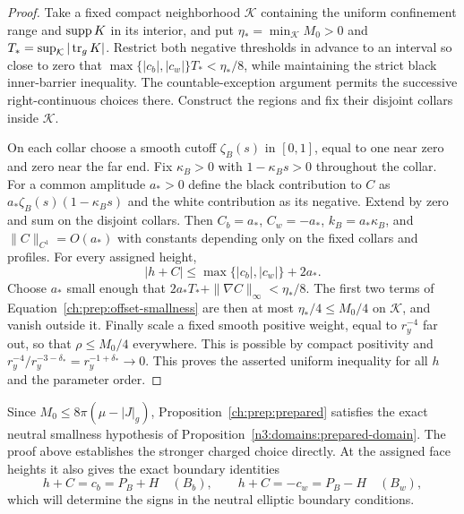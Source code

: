 \begin{proof}
Take a fixed compact neighborhood $\mathcal K$ containing the
uniform confinement range and $\operatorname{supp} K$ in its interior, and put
$\eta_*=\min_{\mathcal K}M_0>0$ and
$T_*=\sup_{\mathcal K}|\operatorname{tr}_gK|$.  Restrict both negative thresholds
in advance to an interval so close to zero that
$\max\{|c_b|,|c_w|\}T_*<\eta_*/8$, while maintaining the strict
black inner-barrier inequality.  The countable-exception argument
permits the successive right-continuous choices there.  Construct
the regions and fix their disjoint collars inside $\mathcal K$.

On each collar choose a smooth cutoff $\zeta_B(s)$ in $[0,1]$,
equal to one near zero and zero near the far end.  Fix
$\kappa_B>0$ with $1-\kappa_Bs>0$ throughout the collar.
For a common amplitude $a_*>0$ define the black contribution to
$C$ as $a_*\zeta_B(s)(1-\kappa_Bs)$ and the white contribution
as its negative.  Extend by zero and sum on the disjoint collars.
Then $C_b=a_*$, $C_w=-a_*$, $k_B=a_*\kappa_B$, and
$\|C\|_{C^1}=O(a_*)$ with constants depending only on the fixed
collars and profiles.  For every assigned height,
\[
 |h+C|\leq\max\{|c_b|,|c_w|\}+2a_*.
\]
Choose $a_*$ small enough that
$2a_*T_*+\|\nabla C\|_\infty<\eta_*/8$.
The first two terms of Equation~\eqref{ch:prep:offset-smallness} are
then at most $\eta_*/4\leq M_0/4$ on $\mathcal K$, and vanish
outside it.  Finally scale a fixed smooth positive weight, equal to
$r_y^{-4}$ far out, so that $\rho\leq M_0/4$ everywhere.
This is possible by compact positivity and
$r_y^{-4}/r_y^{-3-\delta_*}=r_y^{-1+\delta_*}\to0$.
This proves the asserted uniform inequality for all $h$ and the
parameter order.
\end{proof}

Since $M_0\leq8\pi(\mu-|J|_g)$,
Proposition~\ref{ch:prep:prepared} satisfies the exact neutral
smallness hypothesis of Proposition~\ref{n3:domains:prepared-domain}.  The proof above
establishes the stronger charged choice directly.  At the assigned
face heights it also gives the exact boundary identities
\begin{equation}\label{ch:prep:face-values}
 h+C=c_b=P_B+H\quad(B_b),
 \qquad h+C=-c_w=P_B-H\quad(B_w),
\end{equation}
which will determine the signs in the neutral elliptic boundary
conditions.
